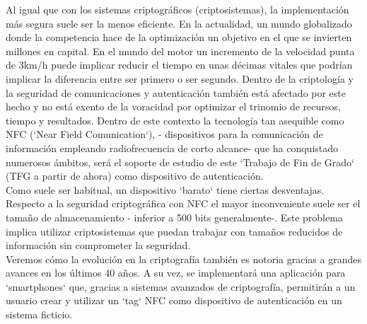 \documentclass[PFC.tex]{subfiles}
\begin{document}
Al igual que con los sistemas criptográficos (criptosistemas), la implementación más segura suele ser la menos eficiente. En la actualidad, un mundo globalizado donde la competencia  hace de la optimización un objetivo en el que se invierten millones en capital. En el mundo del motor un incremento de la velocidad punta de 3km/h puede implicar reducir el tiempo en unas décimas vitales que podrían implicar la diferencia entre ser primero o ser segundo. Dentro de la criptología y la seguridad de comunicaciones y autenticación también está afectado por este hecho y no está exento de la voracidad por optimizar el trinomio de recursos, tiempo y resultados. Dentro de este contexto la tecnología tan asequible como NFC (`Near Field Comunication`), - dispositivos para la comunicación de información empleando radiofrecuencia de corto alcance- que ha conquistado numerosos ámbitos, será el soporte de estudio de este `Trabajo de Fin de Grado` (TFG a partir de ahora) como dispositivo de autenticación.\\

Como suele ser habitual, un dispositivo `barato` tiene ciertas desventajas. Respecto a la seguridad criptográfica con NFC el mayor inconveniente suele ser el tamaño de almacenamiento - inferior a 500 bits generalmente-. Este problema implica utilizar criptosistemas que puedan trabajar con tamaños reducidos de información sin comprometer la seguridad.\\

Veremos cómo la evolución en la criptografía también es notoria gracias a grandes avances en los últimos 40 años. A su vez, se implementará una aplicación para `smartphones` que, gracias a sistemas avanzados de criptografía, permitirán a un usuario crear y utilizar un `tag` NFC como dispositivo de autenticación en un sistema ficticio.\\
\end{document}
